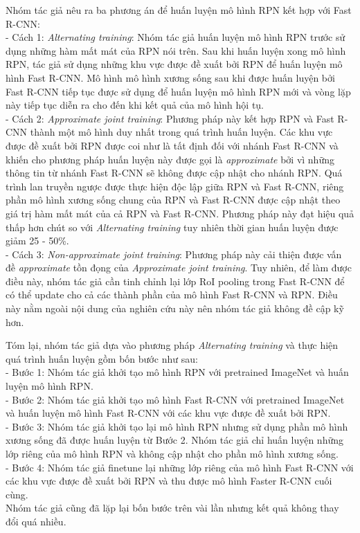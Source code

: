 {    \noindent
    Nhóm tác giả nêu ra ba phương án để huấn luyện mô hình RPN kết hợp với Fast R-CNN: \\
    - Cách 1: \textit{Alternating training}: Nhóm tác giả huấn luyện mô hình RPN trước sử dụng những hàm mất mát của RPN nói trên.
    Sau khi huấn luyện xong mô hình RPN, tác giả sử dụng những khu vực được đề xuất bởi RPN để huấn luyện mô hình Fast R-CNN.
    Mô hình mô hình xương sống sau khi được huấn luyện bởi Fast R-CNN tiếp tục được sử dụng để huấn luyện mô hình RPN mới và vòng lặp này tiếp tục diễn ra cho đến khi kết quả của mô hình hội tụ. \\
    - Cách 2: \textit{Approximate joint training}: Phương pháp này kết hợp RPN và Fast R-CNN thành một mô hình duy nhất trong quá trình huấn luyện.
    Các khu vực được đề xuất bởi RPN được coi như là tất định đối với nhánh Fast R-CNN và khiến cho phương pháp huấn luyện này được gọi là \textit{approximate} bởi vì những thông tin từ nhánh Fast R-CNN sẽ không được cập nhật cho nhánh RPN.
    Quá trình lan truyền ngược được thực hiện độc lập giữa RPN và Fast R-CNN, riêng phần mô hình xương sống chung của RPN và Fast R-CNN được cập nhật theo giá trị hàm mất mát của cả RPN và Fast R-CNN.
    Phương pháp này đạt hiệu quả thấp hơn chút so với \textit{Alternating training} tuy nhiên thời gian huấn luyện được giảm 25 - 50\%. \\
    - Cách 3: \textit{Non-approximate joint training}: Phương pháp này cải thiện được vấn đề \textit{approximate} tồn đọng của \textit{Approximate joint training}.
    Tuy nhiên, để làm được điều này, nhóm tác giả cần tinh chỉnh lại lớp RoI pooling trong Fast R-CNN để có thể update cho cả các thành phần của mô hình Fast R-CNN và RPN.
    Điều này nằm ngoài nội dung của nghiên cứu này nên nhóm tác giả không đề cập kỹ hơn.

    \noindent
    Tóm lại, nhóm tác giả dựa vào phương pháp \textit{Alternating training} và thực hiện quá trình huấn luyện gồm bốn bước như sau: \\
    - Bước 1: Nhóm tác giả khởi tạo mô hình RPN với pretrained ImageNet và huấn luyện mô hình RPN. \\
    - Bước 2: Nhóm tác giả khởi tạo mô hình Fast R-CNN với pretrained ImageNet và huấn luyện mô hình Fast R-CNN với các khu vực được đề xuất bởi RPN. \\
    - Bước 3: Nhóm tác giả khởi tạo lại mô hình RPN nhưng sử dụng phần mô hình xương sống đã được huấn luyện từ Bước 2.
    Nhóm tác giả chỉ huấn luyện những lớp riêng của mô hình RPN và không cập nhật cho phần mô hình xương sống. \\
    - Bước 4: Nhóm tác giả finetune lại những lớp riêng của mô hình Fast R-CNN với các khu vực được đề xuất bởi RPN và thu được mô hình Faster R-CNN cuối cùng. \\
    Nhóm tác giả cũng đã lặp lại bốn bước trên vài lần nhưng kết quả không thay đổi quá nhiều.

}
